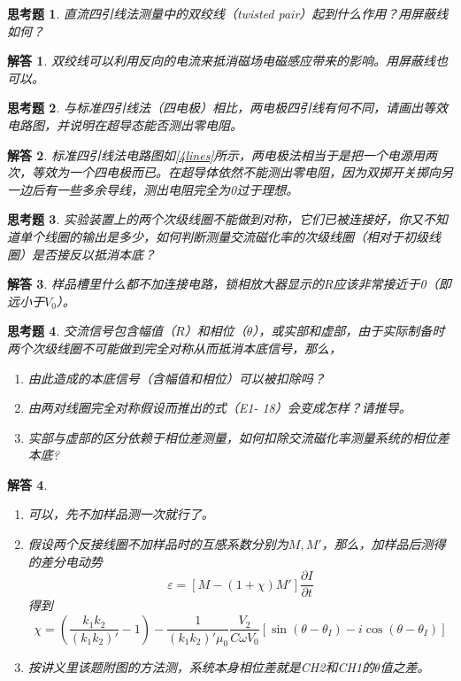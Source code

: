 \documentclass[11pt,a4paper]{ctexart}
\newcommand{\beq}{\begin{equation}}
\newcommand{\eeq}{\end{equation}}
\newcommand{\pfrac}[2]{\frac{\partial #1}{\partial #2}}
\newtheorem{que}{思考题}[section]
\newtheorem{ans}{解答}[section]
\begin{document}
\begin{que}
直流四引线法测量中的双绞线（twisted pair）起到什么作用？用屏蔽线如何？
\end{que}
\begin{ans}
双绞线可以利用反向的电流来抵消磁场电磁感应带来的影响。用屏蔽线也可以。
\end{ans}

\begin{que}
与标准四引线法（四电极）相比，两电极四引线有何不同，请画出等效电路图，并说明在超导态能否测出零电阻。
\end{que}
\begin{ans}
标准四引线法电路图如\cref{4lines}所示，两电极法相当于是把一个电源用两次，等效为一个四电极而已。在超导体依然不能测出零电阻，因为双掷开关掷向另一边后有一些多余导线，测出电阻完全为0过于理想。
\end{ans}

\begin{que}
实验装置上的两个次级线圈不能做到对称，它们已被连接好，你又不知道单个线圈的输出是多少，如何判断测量交流磁化率的次级线圈（相对于初级线圈）是否接反以抵消本底？
\end{que}
\begin{ans}
样品槽里什么都不加连接电路，锁相放大器显示的$R$应该非常接近于0（即远小于$V_0$）。
\end{ans}

\begin{que}
交流信号包含幅值（$R$）和相位（$\theta$），或实部和虚部，由于实际制备时两个次级线圈不可能做到完全对称从而抵消本底信号，那么，
\begin{enumerate}
\item
由此造成的本底信号（含幅值和相位）可以被扣除吗？
\item
由两对线圈完全对称假设而推出的式（E1- 18）会变成怎样？请推导。
\item
实部与虚部的区分依赖于相位差测量，如何扣除交流磁化率测量系统的相位差本底?
\end{enumerate}
\end{que}
\begin{ans}
\begin{enumerate}
\item
可以，先不加样品测一次就行了。
\item
假设两个反接线圈不加样品时的互感系数分别为$M,M'$，那么，加样品后测得的差分电动势
\beq
\varepsilon = [M-(1+\chi)M']\pfrac{I}{t}
\eeq
得到
\beq
\chi = \left(\frac{k_1k_2}{(k_1k_2)'}-1\right) - \frac{1}{(k_1k_2)'\mu_0} \frac{V_2}{C\omega V_0} [\sin (\theta-\theta_I) -i\cos (\theta-\theta_I)]
\eeq
\item
按讲义里该题附图的方法测，系统本身相位差就是CH2和CH1的$\theta$值之差。
\end{enumerate}
\end{ans}
\end{document}
